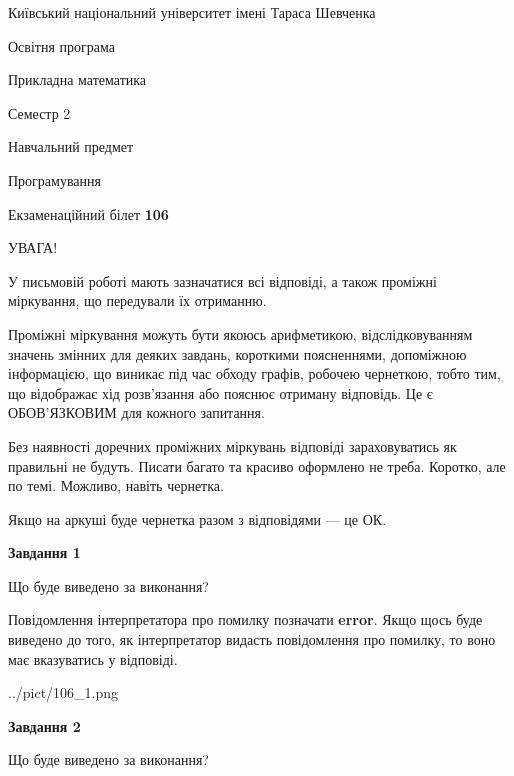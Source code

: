 \documentclass[12pt, ukrainian]{article}
\begin{document}
{{\begin {small}\par
{ \center  Київський національний університет імені Тараса Шевченка \par}
{\parbox {5 cm}{Освітня програма \hfill}{\parbox {7 cm}{Прикладна математика \hfill}}\parbox {6 cm}{\hfill Семестр 2}}\par
{\parbox {5 cm} {Навчальний предмет \hfill}\parbox {7 cm}{Програмування \hfill}\parbox {6cm}{\hfill}\par}\vspace{-7pt} \end{small}}{\center Екзаменаційний білет \No \textbf
{ 106 }\par}}
{
\begin {large}
УВАГА!

У письмовій роботі мають зазначатися всі відповіді, а також проміжні міркування, що передували їх отриманню.

Проміжні міркування можуть бути якоюсь арифметикою, відслідковуванням зна\-чень змінних для деяких завдань,
короткими поясненнями, допоміжною інформацією, що виникає під час обходу графів, робочею чернеткою,
тобто тим, що відображає хід розв’язання або пояснює отриману відповідь.
Це є ОБОВ’ЯЗКОВИМ для кожного запитання.

Без наявності доречних проміжних міркувань відповіді зараховуватись як правиль\-ні не будуть.
Писати багато та красиво оформлено не треба. Коротко, але по темі. Можли\-во, навіть чернетка.

Якщо на аркуші буде чернетка разом з відповідями --- це ОК.

\newpage

{\begin {center}\textbf{Завдання 1}\end {center}}\par
Що буде виведено за виконання?

Повідомлення інтерпретатора про помилку позначати \textbf{error}.
Якщо щось буде виведено до того, як інтерпретатор видасть повідомлення про помилку, 
то воно має вказуватись у відповіді. \par


\begin{center}
	{../pict/106_1.png}
\end{center}
\newpage

{\begin {center}\textbf{Завдання 2}\end {center}}\par
Що буде виведено за виконання?


\end{large}}
\end{document}
